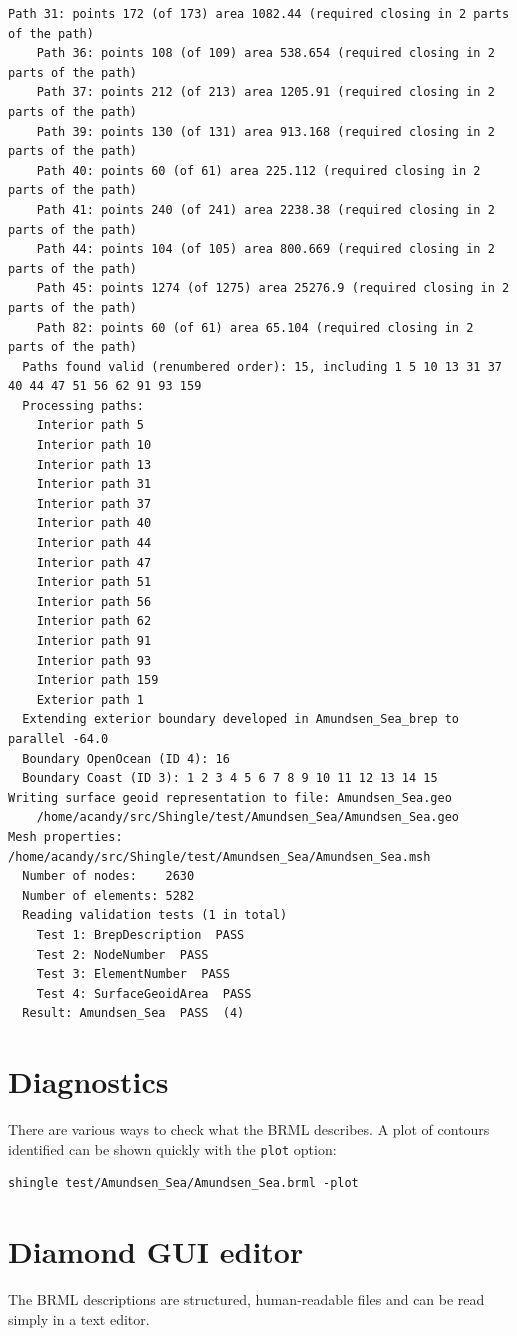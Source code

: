 \documentclass[a4paper, 10pt]{book}
\providecommand{\brml}{BRML\xspace}
\begin{document}
\begin{Verbatim}[fontsize=\scriptsize]
    Path 31: points 172 (of 173) area 1082.44 (required closing in 2 parts of the path)
    Path 36: points 108 (of 109) area 538.654 (required closing in 2 parts of the path)
    Path 37: points 212 (of 213) area 1205.91 (required closing in 2 parts of the path)
    Path 39: points 130 (of 131) area 913.168 (required closing in 2 parts of the path)
    Path 40: points 60 (of 61) area 225.112 (required closing in 2 parts of the path)
    Path 41: points 240 (of 241) area 2238.38 (required closing in 2 parts of the path)
    Path 44: points 104 (of 105) area 800.669 (required closing in 2 parts of the path)
    Path 45: points 1274 (of 1275) area 25276.9 (required closing in 2 parts of the path)
    Path 82: points 60 (of 61) area 65.104 (required closing in 2 parts of the path)
  Paths found valid (renumbered order): 15, including 1 5 10 13 31 37 40 44 47 51 56 62 91 93 159
  Processing paths:
    Interior path 5
    Interior path 10
    Interior path 13
    Interior path 31
    Interior path 37
    Interior path 40
    Interior path 44
    Interior path 47
    Interior path 51
    Interior path 56
    Interior path 62
    Interior path 91
    Interior path 93
    Interior path 159
    Exterior path 1
  Extending exterior boundary developed in Amundsen_Sea_brep to parallel -64.0
  Boundary OpenOcean (ID 4): 16
  Boundary Coast (ID 3): 1 2 3 4 5 6 7 8 9 10 11 12 13 14 15
Writing surface geoid representation to file: Amundsen_Sea.geo
    /home/acandy/src/Shingle/test/Amundsen_Sea/Amundsen_Sea.geo
Mesh properties: /home/acandy/src/Shingle/test/Amundsen_Sea/Amundsen_Sea.msh
  Number of nodes:    2630
  Number of elements: 5282
  Reading validation tests (1 in total)
    Test 1: BrepDescription  PASS
    Test 2: NodeNumber  PASS
    Test 3: ElementNumber  PASS
    Test 4: SurfaceGeoidArea  PASS
  Result: Amundsen_Sea  PASS  (4)
\end{Verbatim}


\section{Diagnostics}
There are various ways to check what the \brml describes.
A plot of contours identified can be shown quickly with the \verb+plot+ option:
\begin{verbatim}
shingle test/Amundsen_Sea/Amundsen_Sea.brml -plot
\end{verbatim}

\section{Diamond GUI editor}
The \brml descriptions are structured, human-readable files and can be read simply in a text editor.
\end{document}
